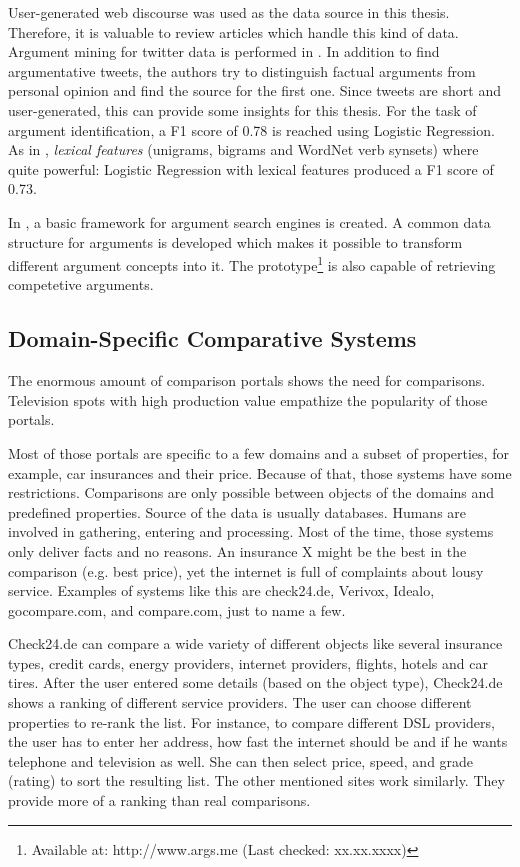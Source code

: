 User-generated web discourse was used as the data source in this thesis. Therefore, it is valuable to review articles which handle this kind of data.
Argument mining for twitter data is performed in \cite{Dusmanu2017Argument-Mining}. In addition to find argumentative tweets, the authors try to distinguish factual arguments from personal opinion and find the source for the first one. Since tweets are short and user-generated, this can provide some insights for this thesis. For the task of argument identification, a F1 score of 0.78 is reached using Logistic Regression. As in \cite{Daxenberger2017What-is-the-Ess}, \emph{lexical features} (unigrams, bigrams and WordNet verb synsets) where quite powerful: Logistic Regression with lexical features produced a F1 score of 0.73.\newline

In \cite{Wachsmuth2017Building-an-arg}, a basic framework for argument search engines is created. A common data structure for arguments is developed which makes it possible to transform different argument concepts into it. The prototype\footnote{Available at: http://www.args.me (Last checked: xx.xx.xxxx)} is also capable of retrieving competetive arguments.



\subsection{Domain-Specific Comparative Systems}
The enormous amount of comparison portals shows the need for comparisons. Television spots with high production value empathize the popularity of those portals.

Most of those portals are specific to a few domains and a subset of properties, for example, car insurances and their price. Because of that, those systems have some restrictions. Comparisons are only possible between objects of the domains and predefined properties. Source of the data is usually databases. Humans are involved in gathering, entering and processing. 
Most of the time, those systems only deliver facts and no reasons. An insurance X might be the best in the comparison (e.g. best price), yet the internet is full of complaints about lousy service.
Examples of systems like this are check24.de, Verivox, Idealo, gocompare.com, and compare.com, just to name a few.

Check24.de can compare a wide variety of different objects like several insurance types, credit cards, energy providers, internet providers, flights, hotels and car tires. After the user entered some details (based on the object type), Check24.de shows a ranking of different service providers. The user can choose different properties to re-rank the list.
For instance, to compare different DSL providers, the user has to enter her address, how fast the internet should be and if he wants telephone and television as well. She can then select price, speed, and grade (rating) to sort the resulting list.
The other mentioned sites work similarly. They provide more of a ranking than real comparisons.

